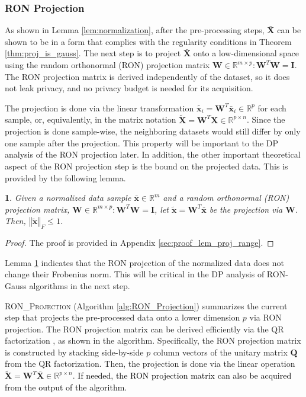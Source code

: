 \documentclass[USenglish,oneside,twocolumn]{article}
\newcommand{\noun}[1]{\textsc{#1}}
\theoremstyle{definition}
\theoremstyle{remark}
\theoremstyle{plain}
\theoremstyle{plain}
\newtheorem{lem}{\protect\lemmaname}
\providecommand{\lemmaname}{Lemma}
\newcommand{\chang}{\textcolor{black}}
\begin{document}
\vspace{-1em}
\subsubsection{RON Projection}

As shown in Lemma \ref{lem:normalization}, after the pre-processing
steps, $\bar{\mathbf{X}}$ can be shown to be in a form that complies
with the regularity conditions in Theorem \ref{thm:proj_is_gauss}.
The next step is to project $\bar{\mathbf{X}}$ onto a low-dimensional
space using the random orthonormal (RON) projection matrix $\mathbf{W}\in\mathbb{R}^{m\times p}:\mathbf{W}^{T}\mathbf{W}=\mathbf{I}$.
The RON projection matrix is derived independently of the dataset,
so it does not leak privacy, and no privacy budget is needed for its
acquisition.

The projection is done via the linear transformation $\widetilde{\mathbf{x}_{i}}=\mathbf{W}^{T}\bar{\mathbf{x}}_{i}\in\mathbb{R}^{p}$
for each sample, or, equivalently, in the matrix notation $\widetilde{\mathbf{X}}=\mathbf{W}^{T}\mathbf{X}\in\mathbb{R}^{p\times n}$.
Since the projection is done sample-wise, the neighboring datasets
would still differ by only one sample after the projection. This property
will be important to the DP analysis of the RON projection later.
In addition, the other important theoretical aspect of the RON projection
step is the bound on the projected data. This is provided by the following
lemma.
\begin{lem} \label{lem:proj_range} 
Given a normalized data sample $\bar{\mathbf{x}}\in\mathbb{R}^{m}$
and a random orthonormal (RON) projection matrix, $\mathbf{W}\in\mathbb{R}^{m\times p}:\mathbf{W}^{T}\mathbf{W}=\mathbf{I}$,
let $\widetilde{\mathbf{x}}=\mathbf{W}^{T}\bar{\mathbf{x}}$ be the projection
via $\mathbf{W}$. Then, $\left\Vert \widetilde{\mathbf{x}}\right\Vert _{F}\leq1$. 
\end{lem}
\begin{proof}
The proof is provided in Appendix \ref{sec:proof_lem_proj_range}.
\end{proof}

Lemma \ref{lem:proj_range} indicates that the RON projection of the
normalized data does not change their Frobenius norm. This will be critical in the DP analysis of RON-Gauss algorithms in the next step.


\noun{RON\_Projection} (Algorithm \ref{alg:RON_Projection}) summarizes
the current step that projects the pre-processed data onto a lower dimension
$p$ via RON projection. The RON projection matrix can be derived
efficiently via the QR factorization \cite{RefWorks:533,RefWorks:534},
as shown in the algorithm. Specifically, the RON projection matrix
is constructed by stacking side-by-side $p$ column vectors of the
unitary matrix $\mathbf{Q}$ from the QR factorization. Then, the projection is done via the linear operation
{\small{}$\widetilde{\mathbf{X}}=\mathbf{W}^{T}\bar{\mathbf{X}}\in\mathbb{R}^{p\times n}$.}{\small} \chang{If needed, the RON projection matrix can also be acquired from the output of the algorithm.}
\end{document}

